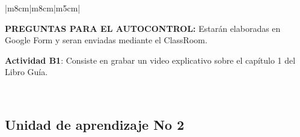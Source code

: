 \documentclass[a4pa<per,12pt,spanish]{article}
\begin{document}
\begin{tabular}[H]{|m{8cm}|m{8cm}|m{5cm}|}
  \begin{minipage}[H]{1.0\linewidth}
 

     \textbf{PREGUNTAS PARA EL AUTOCONTROL:} Estarán elaboradas en Google Form y seran enviadas mediante el ClassRoom.
    
      \vspace{0.5cm}
     \colorbox{green!30}{\parbox[t]{2in}{\textbf{Actividad B1}: Consiste en grabar un video
      explicativo sobre el capítulo 1 del Libro Guía.}}
      
  \end{minipage}

  \\ \hline

\end{tabular}


\newpage


\subsection{Unidad de aprendizaje No 2}
\label{sec:unid-de-aprend}
\end{document}
